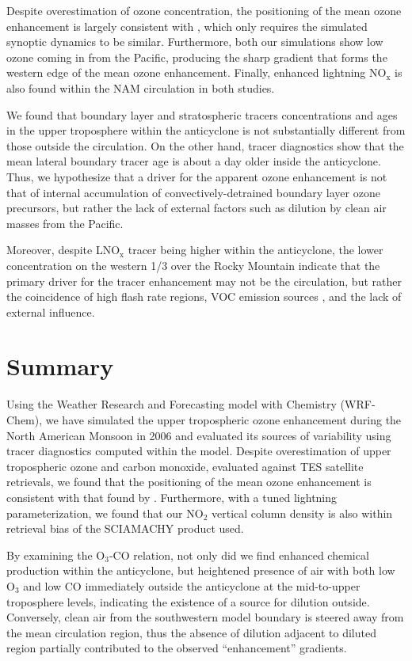 Despite overestimation of ozone concentration, the positioning of the mean ozone
enhancement is largely consistent with \citet{Cooper:2007cr}, which only
requires the simulated synoptic dynamics to be similar. Furthermore, both our simulations
show low ozone coming in from the Pacific, producing the sharp gradient that forms
the western edge of the mean ozone enhancement. Finally, enhanced lightning
NO$_{\mathrm{x}}$ is also found within the NAM circulation in both studies.

We found that boundary layer and stratospheric tracers concentrations
and ages in the upper troposphere within the anticyclone is not substantially different from
those outside the circulation. On the other hand, tracer diagnostics show that the mean lateral
boundary tracer age is about a day older inside the anticyclone. Thus, we hypothesize
that a driver for the apparent ozone enhancement is not that of internal accumulation of
convectively-detrained boundary layer ozone precursors, but rather the lack of
external factors such as dilution by clean air masses from the Pacific.

Moreover, despite LNO$_{\mathrm{x}}$ tracer being higher within the anticyclone, the
lower concentration on the western 1/3 over the Rocky Mountain indicate that the
primary driver for the tracer enhancement may not be the circulation, but rather the
coincidence of high flash rate regions, VOC emission sources \citep{Barth:2012qf}, and the lack of external
influence.

\section{Summary}\label{sect:summary}

Using the Weather Research and Forecasting model with Chemistry (WRF-Chem),
we have simulated the upper tropospheric ozone enhancement during the North
American Monsoon in 2006 and evaluated its sources of variability using tracer
diagnostics computed within the model. Despite overestimation of upper tropospheric
ozone and carbon monoxide, evaluated against TES satellite retrievals, we found that the positioning
of the mean ozone enhancement is consistent with that found by \citet{Cooper:2007cr}.
Furthermore, with a tuned lightning parameterization, we found that our 
NO$_2$ vertical column density is also within retrieval bias of the SCIAMACHY
product used.

By examining the O$_3$-CO relation, not only did we find enhanced chemical production
within the anticyclone, but heightened presence of air with both low O$_3$ and low CO
immediately outside the anticyclone at the mid-to-upper troposphere levels, indicating the existence of a
source for dilution outside. Conversely, clean air from the southwestern model
boundary is steered away from the mean circulation region, thus the absence of
dilution adjacent to diluted region partially contributed to the observed ``enhancement''
gradients.

